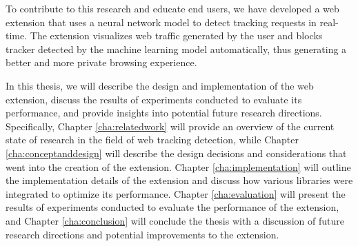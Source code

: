 To contribute to this research and educate end users, we have developed a web extension
that uses a neural network model to detect tracking requests in real-time. 
The extension visualizes web traffic generated by the user and blocks tracker detected by the machine learning model automatically, thus
generating a better and more private browsing experience.

In this thesis, we will describe the design and implementation of the web extension,
discuss the results of experiments conducted to evaluate its performance,
and provide insights into potential future research directions.
Specifically, Chapter \ref{cha:relatedwork} will provide an overview of the current state of research
in the field of web tracking detection, while Chapter \ref{cha:conceptanddesign} will describe the design decisions
and considerations that went into the creation of the extension. 
Chapter \ref{cha:implementation} will outline the implementation details of the extension and
discuss how various libraries were integrated to optimize its performance.
Chapter \ref{cha:evaluation} will present the results of experiments conducted to evaluate
the performance of the extension, and Chapter \ref{cha:conclusion} will conclude the thesis
with a discussion of future research directions and potential improvements to the extension.



